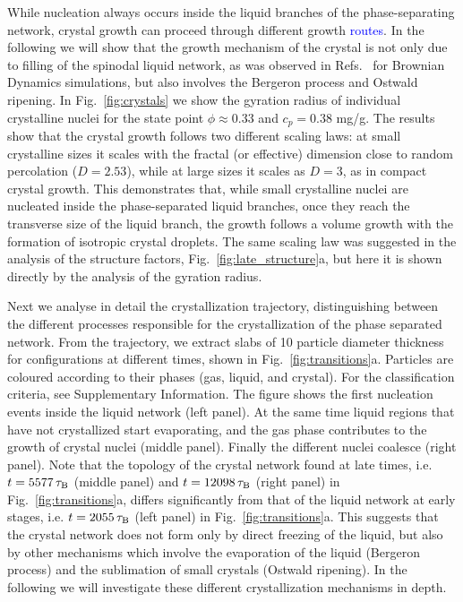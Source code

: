 \documentclass[preprint,amsmath,amssymb,superscriptaddress]{revtex4-1}
\begin{document}
While nucleation always occurs inside the liquid branches of the phase-separating network, crystal growth can proceed through different growth \textcolor{blue}{routes}.
In the following we will show that the growth mechanism of the crystal is not only due to filling of the spinodal liquid network, as was observed in Refs.~\cite{soga1999metastable,fortini2008crystallization,perez2011pathways} for Brownian Dynamics simulations, but also involves the Bergeron process and Ostwald ripening. 
In Fig.~\ref{fig:crystals} we show the gyration radius of individual crystalline nuclei for the state point 
$\phi\approx 0.33$ and $c_p=0.38$ mg/g. The results show that the crystal growth follows two different scaling laws: at small crystalline sizes it scales with 
the fractal (or effective) dimension close to random percolation ($D=2.53$), while at large sizes it scales as $D=3$, as in compact crystal growth. This demonstrates that, while 
small crystalline nuclei are nucleated inside the phase-separated liquid branches, once they reach the transverse size of the liquid branch, the growth 
follows a volume growth with the formation of isotropic crystal droplets. The same scaling law was suggested in the analysis of the
structure factors, Fig.~\ref{fig:late_structure}a, but here it is shown directly by the analysis of the gyration radius. 

Next we analyse in detail the crystallization trajectory, distinguishing between the different processes responsible for the
crystallization of the phase separated network.
From the trajectory, we extract slabs of 10 particle diameter thickness for configurations at different times, shown in Fig.~\ref{fig:transitions}a. 
Particles are coloured according to their phases (gas, liquid, and crystal). For the classification criteria, see Supplementary Information. The figure shows the first nucleation 
events inside the liquid network (left panel). At the same time liquid regions that have not crystallized start evaporating, and the gas phase contributes to the growth of crystal nuclei (middle panel). Finally the different nuclei coalesce (right panel). 
Note that the topology of the crystal network found at late times, i.e. $t=5577\,\tau_{\rm B}$ (middle panel) and $t=12098\,\tau_{\rm B}$ (right panel) in Fig.~\ref{fig:transitions}a, differs significantly from that of the liquid network at early stages, i.e. $t=2055\,\tau_{\rm B}$ (left panel) in Fig.~\ref{fig:transitions}a. This suggests that the crystal network does not form only by direct freezing of the liquid, but also by other mechanisms which involve the evaporation of the liquid (Bergeron process) and the sublimation of small crystals (Ostwald ripening). In the following we will investigate these different crystallization mechanisms in depth.
 
\end{document}
